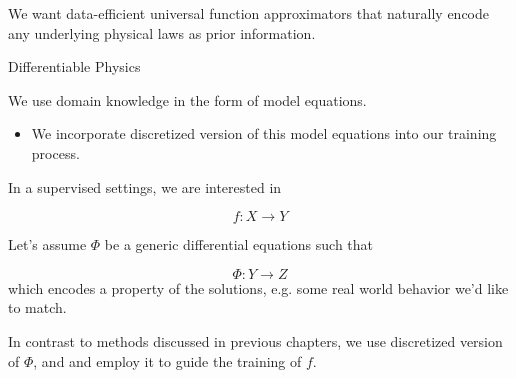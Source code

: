 \documentclass[aspectratio=169,xcolor=dvipsnames,svgnames,x11names,fleqn]{beamer}
\begin{document}
\begin{frame}
 \sectionpage
 
 \begin{center}
 \bigskip
 
 \large  We want  data-efficient universal function approximators that naturally encode any underlying physical laws as prior information. 
 \end{center}
\end{frame}


\begin{frame}{Differentiable Physics}

We use domain knowledge in the form of model equations.

\begin{itemize}
\item We incorporate discretized version of this model equations into our training process.\end{itemize}



In a supervised settings, we are interested in 

$$
f: X\to Y
$$

Let's assume $\Phi$ be a generic differential equations such that

$$
\Phi: Y \to Z
$$
which encodes a property of the solutions, e.g. some real world behavior we’d like to match. 

  \begin{tcolorbox}[    enhanced,
    colback=softMint,
    colframe=borderLine,
    sharp corners,
    arc=0pt, 
    boxrule=0.4pt,
    leftrule=3pt,
    borderline west={5pt}{0pt}{highlightOrange}, 
    fontupper=\color{boxBackground},
    pad at break*=0mm,
    top=5pt, bottom=5pt, left=5pt, right=5pt]
  In contrast to methods discussed in previous chapters, we use discretized version of $\Phi$, and  and employ it to guide the training of $f$.
  \end{tcolorbox}


\end{frame}
\end{document}
